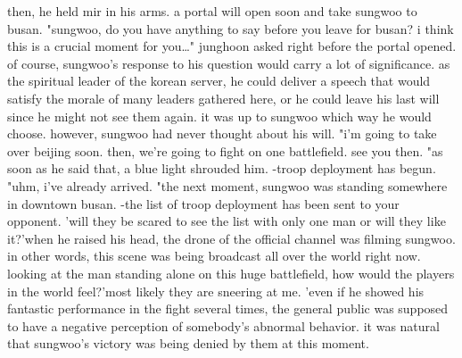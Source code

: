 then, he held mir in his arms.
a portal will open soon and take sungwoo to busan.
"sungwoo, do you have anything to say before you leave for busan? i think this is a crucial moment for you…" junghoon asked right before the portal opened.
 of course, sungwoo's response to his question would carry a lot of significance.
 as the spiritual leader of the korean server, he could deliver a speech that would satisfy the morale of many leaders gathered here, or he could leave his last will since he might not see them again.
 it was up to sungwoo which way he would choose.
however, sungwoo had never thought about his will.
"i'm going to take over beijing soon.
 then, we're going to fight on one battlefield.
 see you then.
"as soon as he said that, a blue light shrouded him.
-troop deployment has begun.
 "uhm, i've already arrived.
"the next moment, sungwoo was standing somewhere in downtown busan.
-the list of troop deployment has been sent to your opponent.
'will they be scared to see the list with only one man or will they like it?'when he raised his head, the drone of the official channel was filming sungwoo.
 in other words, this scene was being broadcast all over the world right now.
looking at the man standing alone on this huge battlefield, how would the players in the world feel?'most likely they are sneering at me.
'even if he showed his fantastic performance in the fight several times, the general public was supposed to have a negative perception of somebody's abnormal behavior.
 it was natural that sungwoo's victory was being denied by them at this moment.


